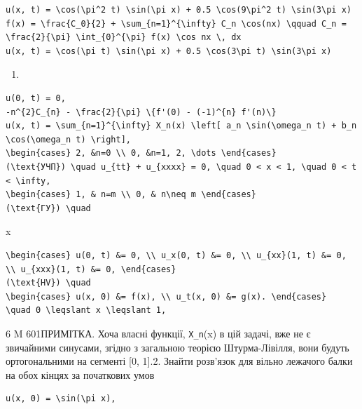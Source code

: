 \documentclass[
  ukrainian,
]{article}
\providecommand{\tightlist}{%
  \setlength{\itemsep}{0pt}\setlength{\parskip}{0pt}}
\begin{document}
\begin{verbatim}
u(x, t) = \cos(\pi^2 t) \sin(\pi x) + 0.5 \cos(9\pi^2 t) \sin(3\pi x)
f(x) = \frac{C_0}{2} + \sum_{n=1}^{\infty} C_n \cos(nx) \qquad C_n = \frac{2}{\pi} \int_{0}^{\pi} f(x) \cos nx \, dx
u(x, t) = \cos(\pi t) \sin(\pi x) + 0.5 \cos(3\pi t) \sin(3\pi x)
\end{verbatim}

\begin{enumerate}
\def\labelenumi{\arabic{enumi}.}
\tightlist
\item
\end{enumerate}

\begin{verbatim}
u(0, t) = 0,
-n^{2}C_{n} - \frac{2}{\pi} \{f'(0) - (-1)^{n} f'(n)\}
u(x, t) = \sum_{n=1}^{\infty} X_n(x) \left[ a_n \sin(\omega_n t) + b_n \cos(\omega_n t) \right],
\begin{cases} 2, &n=0 \\ 0, &n=1, 2, \dots \end{cases}
(\text{УЧП}) \quad u_{tt} + u_{xxxx} = 0, \quad 0 < x < 1, \quad 0 < t < \infty,
\begin{cases} 1, & n=m \\ 0, & n\neq m \end{cases}
(\text{ГУ}) \quad
\end{verbatim}

x

\begin{verbatim}
\begin{cases} u(0, t) &= 0, \\ u_x(0, t) &= 0, \\ u_{xx}(1, t) &= 0, \\ u_{xxx}(1, t) &= 0, \end{cases}
(\text{HV}) \quad
\begin{cases} u(x, 0) &= f(x), \\ u_t(x, 0) &= g(x). \end{cases}
\quad 0 \leqslant x \leqslant 1,
\end{verbatim}

6 M 601ПРИМІТКА. Хоча власні функції, \texttt{X\_n}(x) в цій задачі, вже
не є звичайними синусами, згідно з загальною теорією Штурма-Лівілля,
вони будуть ортогональними на сегменті {[}0, 1{]}.2. Знайти розв'язок
для вільно лежачого балки на обох кінцях за початкових умов

\begin{verbatim}
u(x, 0) = \sin(\pi x),
\end{verbatim}
\end{document}
